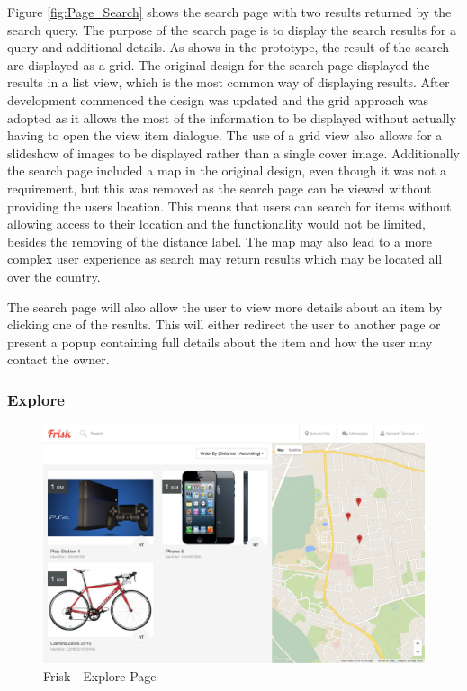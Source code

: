 Figure \ref{fig:Page_Search} shows the search page with two results returned by the search query. The purpose of the search page is to display the search results for a query and additional details. As shows in the prototype, the result of the search are displayed as a grid. The original design for the search page displayed the results in a list view, which is the most common way of displaying results. After development commenced the design was updated and the grid approach was adopted as it allows the most of the information to be displayed without actually having to open the view item dialogue. The use of a grid view also allows for a slideshow of images to be displayed rather than a single cover image. Additionally the search page included a map in the original design, even though it was not a requirement, but this was removed as the search page can be viewed without providing the users location. This means that users can search for items without allowing access to their location and the functionality would not be limited, besides the removing of the distance label. The map may also lead to a more complex user experience as search may return results which may be located all over the country.

The search page will also allow the user to view more details about an item by clicking one of the results. This will either redirect the user to another page or present a popup containing full details about the item and how the user may contact the owner.

\subsubsection{Explore}

\begin{figure}[H]
	\centering
	\includegraphics[width=1.0\textwidth]{images/Frisk/Page_Explore}
	\caption{Frisk - Explore Page} \label{fig:Page_Explore}
\end{figure}

